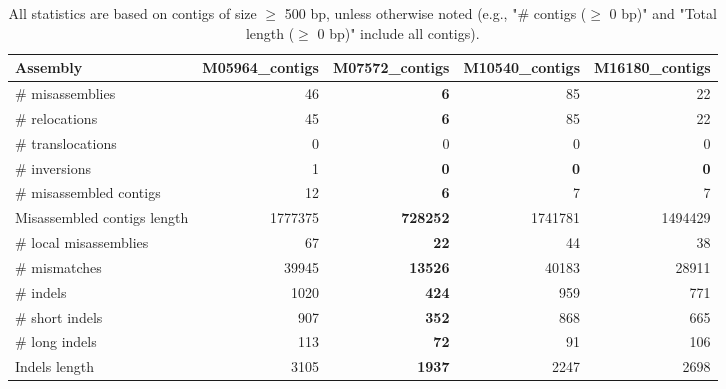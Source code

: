\documentclass[12pt,a4paper]{article}
\begin{document}
\begin{table}[ht]
\begin{center}
\caption{All statistics are based on contigs of size $\geq$ 500 bp, unless otherwise noted (e.g., "\# contigs ($\geq$ 0 bp)" and "Total length ($\geq$ 0 bp)" include all contigs).}
\begin{tabular}{|l*{4}{|r}|}
\hline
Assembly & M05964\_contigs & M07572\_contigs & M10540\_contigs & M16180\_contigs \\ \hline
\# misassemblies & 46 & {\bf 6} & 85 & 22 \\ \hline
\hspace{5mm}\# relocations & 45 & {\bf 6} & 85 & 22 \\ \hline
\hspace{5mm}\# translocations & 0 & 0 & 0 & 0 \\ \hline
\hspace{5mm}\# inversions & 1 & {\bf 0} & {\bf 0} & {\bf 0} \\ \hline
\# misassembled contigs & 12 & {\bf 6} & 7 & 7 \\ \hline
Misassembled contigs length & 1777375 & {\bf 728252} & 1741781 & 1494429 \\ \hline
\# local misassemblies & 67 & {\bf 22} & 44 & 38 \\ \hline
\# mismatches & 39945 & {\bf 13526} & 40183 & 28911 \\ \hline
\# indels & 1020 & {\bf 424} & 959 & 771 \\ \hline
\hspace{5mm}\# short indels & 907 & {\bf 352} & 868 & 665 \\ \hline
\hspace{5mm}\# long indels & 113 & {\bf 72} & 91 & 106 \\ \hline
Indels length & 3105 & {\bf 1937} & 2247 & 2698 \\ \hline
\end{tabular}
\end{center}
\end{table}
\end{document}
